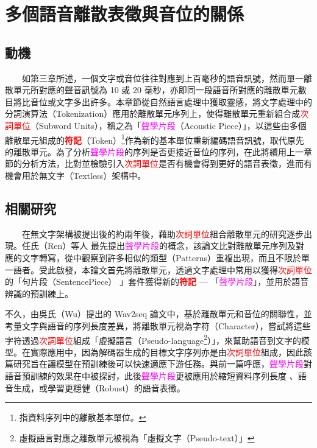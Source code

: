 \renewcommand{\arraystretch}{0.7}
\chapter{多個語音離散表徵與音位的關係}

\section{動機}

　　如第三章所述，一個文字或音位往往對應到上百毫秒的語音訊號，然而單一離散單元所對應的聲音訊號為 10 或 20 毫秒，亦即同一段語音所對應的離散單元數目將比音位或文字多出許多。本章節從自然語言處理中獲取靈感，將文字處理中的分詞演算法（Tokenization）應用於離散單元序列上，使得離散單元重新組合成\textcolor{red}{次詞單位}（Subword Units），稱之為「\textcolor{magenta}{聲學片段}（Acoustic Piece）」，以這些由多個離散單元組成的\textbf{\textcolor{red}{符記}}（Token）\footnote{指資料序列中的離散基本單位。}作為新的基本單位重新編碼語音訊號，取代原先的離散單元。為了分析\textcolor{magenta}{聲學片段}的序列是否更接近音位的序列，在此將續用上一章節的分析方法，比對並檢驗引入\textcolor{red}{次詞單位}是否有機會得到更好的語音表徵，進而有機會用於無文字（Textless）架構\cite{lakhotia_generative_2021, lakhotia_generative_2021-1, noauthor_textless_2021}中。

\section{相關研究} 

　　在無文字架構被提出後的約兩年後，藉助\textcolor{red}{次詞單位}組合離散單元的研究逐步出現。任氏（Ren）等人 \cite{ren_speech_2022} 最先提出\textcolor{magenta}{聲學片段}的概念，該論文比對離散單元序列及對應的文字轉寫，從中觀察到許多相似的類型（Patterns）重複出現，而且不限於單一語者。受此啟發，本論文首先將離散單元，透過文字處理中常用以獲得\textcolor{red}{次詞單位}的「句片段（SentencePiece） \cite{kudo_sentencepiece_2018} 」套件獲得新的\textbf{\textcolor{red}{符記}} --- 「\textcolor{magenta}{聲學片段}」，並用於語音辨識的預訓練上。

        不久，由吳氏（Wu）提出的 Wav2seq \cite{wu_wav2seq_2023}論文中，基於離散單元和音位的關聯性，並考量文字與語音的序列長度差異，將離散單元視為字符（Character），嘗試將這些字符透過\textcolor{red}{次詞單位}組成「虛擬語言（Pseudo-language\footnote{虛擬語言對應之離散單元被視為「虛擬文字（Pseudo-text）」}）」，來幫助語音到文字的模型。在實際應用中，因為解碼器生成的目標文字序列亦是由\textcolor{red}{次詞單位}組成，因此該篇研究旨在讓模型在預訓練後可以快速適應下游任務。與前一篇呼應，\textcolor{magenta}{聲學片段}對語音預訓練的效果在\cite{10096788}中被探討，此後\textcolor{magenta}{聲學片段}更被應用於縮短資料序列長度\cite{chang_exploration_2023} 、語音生成\cite{shen2024acoustic}，或學習更穩健（Robust）的語音表徵\cite{chang2023r}。

